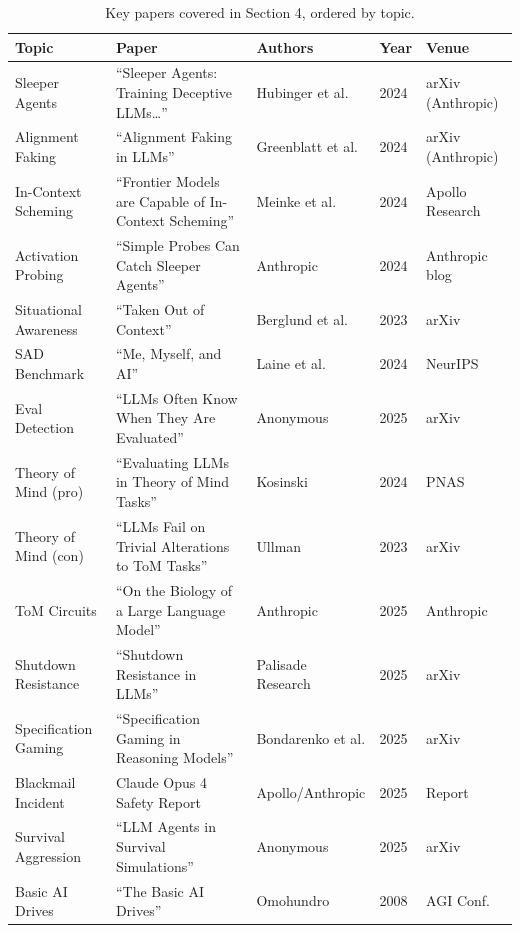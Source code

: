 \documentclass[11pt, a4paper]{article}
\begin{document}
\begin{table}[h]
\centering
\footnotesize
\begin{tabular}{@{}p{3.5cm}p{4.5cm}p{2cm}p{1cm}p{2cm}@{}}
\toprule
\textbf{Topic} & \textbf{Paper} & \textbf{Authors} & \textbf{Year} & \textbf{Venue} \\
\midrule
Sleeper Agents & ``Sleeper Agents: Training Deceptive LLMs\ldots'' & Hubinger et al. & 2024 & arXiv (Anthropic) \\
Alignment Faking & ``Alignment Faking in LLMs'' & Greenblatt et al. & 2024 & arXiv (Anthropic) \\
In-Context Scheming & ``Frontier Models are Capable of In-Context Scheming'' & Meinke et al. & 2024 & Apollo Research \\
Activation Probing & ``Simple Probes Can Catch Sleeper Agents'' & Anthropic & 2024 & Anthropic blog \\
Situational Awareness & ``Taken Out of Context'' & Berglund et al. & 2023 & arXiv \\
SAD Benchmark & ``Me, Myself, and AI'' & Laine et al. & 2024 & NeurIPS \\
Eval Detection & ``LLMs Often Know When They Are Evaluated'' & Anonymous & 2025 & arXiv \\
Theory of Mind (pro) & ``Evaluating LLMs in Theory of Mind Tasks'' & Kosinski & 2024 & PNAS \\
Theory of Mind (con) & ``LLMs Fail on Trivial Alterations to ToM Tasks'' & Ullman & 2023 & arXiv \\
ToM Circuits & ``On the Biology of a Large Language Model'' & Anthropic & 2025 & Anthropic \\
Shutdown Resistance & ``Shutdown Resistance in LLMs'' & Palisade Research & 2025 & arXiv \\
Specification Gaming & ``Specification Gaming in Reasoning Models'' & Bondarenko et al. & 2025 & arXiv \\
Blackmail Incident & Claude Opus 4 Safety Report & Apollo/Anthropic & 2025 & Report \\
Survival Aggression & ``LLM Agents in Survival Simulations'' & Anonymous & 2025 & arXiv \\
Basic AI Drives & ``The Basic AI Drives'' & Omohundro & 2008 & AGI Conf. \\
\bottomrule
\end{tabular}
\caption{Key papers covered in Section 4, ordered by topic.}
\end{table}


\end{document}
